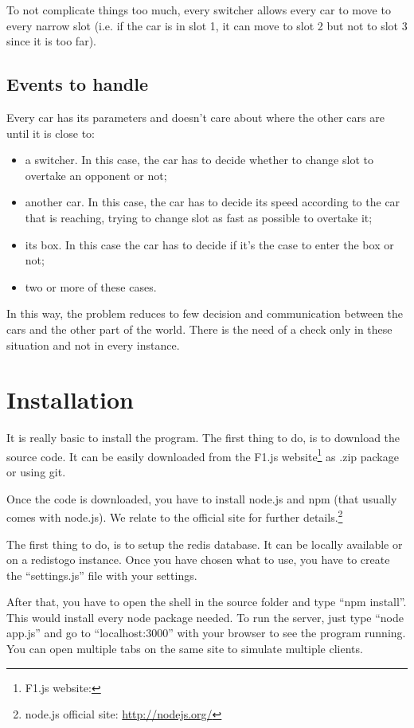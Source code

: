 To not complicate things too much, every switcher allows every car to move to every narrow slot (i.e. if the car is in slot 1, it can move to slot 2 but not to slot 3 since it is too far).

\subsection{Events to handle}

Every car has its parameters and doesn't care about where the other cars are until it is close to:
\begin{itemize}
\item a switcher. In this case, the car has to decide whether to change slot to overtake an opponent or not;
\item another car. In this case, the car has to decide its speed according to the car that is reaching, trying to change slot as fast as possible to overtake it;
\item its box. In this case the car has to decide if it's the case to enter the box or not;
\item two or more of these cases.
\end{itemize}

In this way, the problem reduces to few decision and communication between the cars and the other part of the world. There is the need of a check only in these situation and not in every instance.

\appendix
\section{Installation}

It is really basic to install the program. The first thing to do, is to download the source code. It can be easily downloaded from the F1.js website\footnote{F1.js website: \PROJECTurl} as .zip package or using git.

Once the code is downloaded, you have to install node.js and npm (that usually comes with node.js). We relate to the official site for further details.\footnote{node.js official site: \url{http://nodejs.org/}}

The first thing to do, is to setup the redis database. It can be locally available or on a redistogo instance. Once you have chosen what to use, you have to create the ``settings.js'' file with your settings.

After that, you have to open the shell in the source folder and type ``npm install''. This would install every node package needed. To run the server, just type ``node app.js'' and go to ``localhost:3000'' with your browser to see the program running. You can open multiple tabs on the same site to simulate multiple clients.

